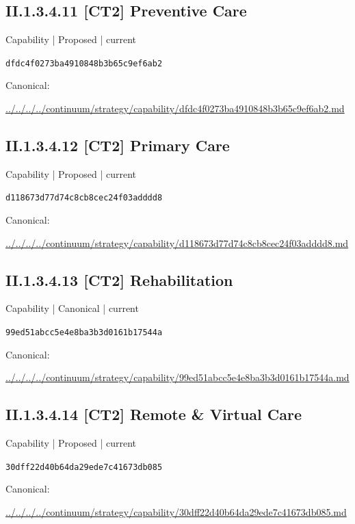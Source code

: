\documentclass[10pt,a4paper]{article}
\begin{document}
\subsection*{II.1.3.4.11 [CT2] Preventive Care}
{\small Capability | Proposed | current}\par
\texttt{dfdc4f0273ba4910848b3b65c9ef6ab2}\par
Canonical: \par
{\footnotesize\url{../../../../continuum/strategy/capability/dfdc4f0273ba4910848b3b65c9ef6ab2.md}}\par
\subsection*{II.1.3.4.12 [CT2] Primary Care}
{\small Capability | Proposed | current}\par
\texttt{d118673d77d74c8cb8cec24f03adddd8}\par
Canonical: \par
{\footnotesize\url{../../../../continuum/strategy/capability/d118673d77d74c8cb8cec24f03adddd8.md}}\par
\subsection*{II.1.3.4.13 [CT2] Rehabilitation}
{\small Capability | Canonical | current}\par
\texttt{99ed51abcc5e4e8ba3b3d0161b17544a}\par
Canonical: \par
{\footnotesize\url{../../../../continuum/strategy/capability/99ed51abcc5e4e8ba3b3d0161b17544a.md}}\par
\subsection*{II.1.3.4.14 [CT2] Remote \& Virtual Care}
{\small Capability | Proposed | current}\par
\texttt{30dff22d40b64da29ede7c41673db085}\par
Canonical: \par
{\footnotesize\url{../../../../continuum/strategy/capability/30dff22d40b64da29ede7c41673db085.md}}\par
\end{document}

